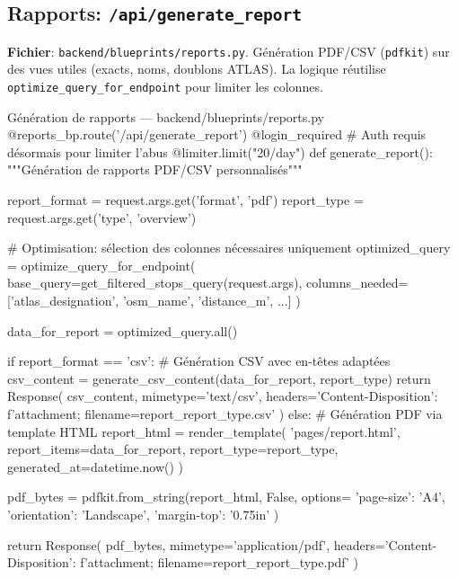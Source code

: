 \subsection{Rapports: \texttt{/api/generate\_report}}

\textbf{Fichier}: \texttt{backend/blueprints/reports.py}. Génération PDF/CSV (\texttt{pdfkit}) sur des vues utiles (exacts, noms, doublons ATLAS). La logique réutilise \texttt{optimize\_query\_for\_endpoint} pour limiter les colonnes.

\begin{codebox}[language=Python]{Génération de rapports — backend/blueprints/reports.py}
@reports_bp.route('/api/generate_report')
@login_required  # Auth requis désormais pour limiter l'abus
@limiter.limit("20/day")
def generate_report():
    """Génération de rapports PDF/CSV personnalisés"""
    
    report_format = request.args.get('format', 'pdf')
    report_type = request.args.get('type', 'overview')
    
    # Optimisation: sélection des colonnes nécessaires uniquement
    optimized_query = optimize_query_for_endpoint(
        base_query=get_filtered_stops_query(request.args),
        columns_needed=['atlas_designation', 'osm_name', 'distance_m', ...]
    )
    
    data_for_report = optimized_query.all()
    
    if report_format == 'csv':
        # Génération CSV avec en-têtes adaptées
        csv_content = generate_csv_content(data_for_report, report_type)
        return Response(
            csv_content,
            mimetype='text/csv',
            headers={'Content-Disposition': f'attachment; filename=report_{report_type}.csv'}
        )
    else:
        # Génération PDF via template HTML
        report_html = render_template(
            'pages/report.html', 
            report_items=data_for_report,
            report_type=report_type,
            generated_at=datetime.now()
        )
        
        pdf_bytes = pdfkit.from_string(report_html, False, options={
            'page-size': 'A4',
            'orientation': 'Landscape',
            'margin-top': '0.75in'
        })
        
        return Response(
            pdf_bytes,
            mimetype='application/pdf',
            headers={'Content-Disposition': f'attachment; filename=report_{report_type}.pdf'}
        )
\end{codebox}

